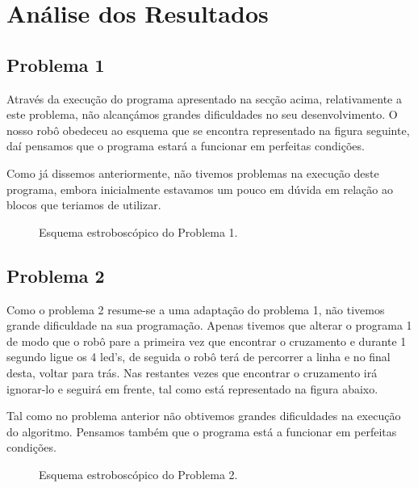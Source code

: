 \documentclass[a4paper, 12pt, onecolumn, oneside]{report}
\begin{document}
 \newpage
 






\section{Análise dos Resultados}


\subsection{Problema 1}

Através da execução do programa apresentado na secção acima, relativamente a este problema, não alcançámos grandes dificuldades no seu desenvolvimento. O nosso robô obedeceu ao esquema que se encontra representado na figura seguinte, daí pensamos que o programa estará a funcionar em perfeitas condições.

Como já dissemos anteriormente, não tivemos problemas na execução deste programa, embora inicialmente estavamos um pouco em dúvida em relação ao blocos que teriamos de utilizar.  

\begin{figure}[H]
\caption{Esquema estroboscópico do Problema 1.}
\label{fig:speciation}
\end{figure}

\newpage
\subsection{Problema 2}

Como o problema 2 resume-se a uma adaptação do problema 1, não tivemos grande dificuldade na sua programação. Apenas tivemos que alterar o programa 1 de modo que o robô pare a primeira vez que encontrar o cruzamento e durante 1 segundo ligue os 4 led's, de seguida o robô terá de percorrer a linha e no final desta, voltar para trás.  Nas restantes vezes que encontrar o cruzamento irá ignorar-lo e seguirá em frente, tal como está representado na figura abaixo.

Tal como no problema anterior não obtivemos grandes dificuldades na execução do algoritmo. Pensamos também que o programa está a funcionar em perfeitas condições. 


\begin{figure}[H]
\caption{Esquema estroboscópico do Problema 2.}
\label{fig:speciation}
\end{figure}
\end{document}
